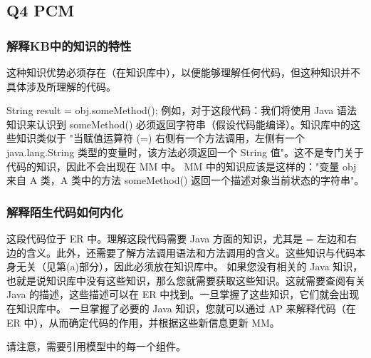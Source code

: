 \subsection{Q4 PCM}
\subsubsection{解释KB中的知识的特性}

这种知识优势必须存在（在知识库中），以便能够理解任何代码，但这种知识并不具体涉及所理解的代码。

String result = obj.someMethod(); 例如，对于这段代码：我们将使用 Java 语法知识来认识到 someMethod() 必须返回字符串（假设代码能编译）。知识库中的这些知识类似于 "当赋值运算符 (=) 右侧有一个方法调用，左侧有一个 java.lang.String 类型的变量时，该方法必须返回一个 String 值"。这不是专门关于代码的知识，因此不会出现在 MM 中。
MM 中的知识应该是这样的："变量 obj 来自 A 类，A 类中的方法 someMethod() 返回一个描述对象当前状态的字符串"。

\subsubsection{解释陌生代码如何内化}
这段代码位于 ER 中。理解这段代码需要 Java 方面的知识，尤其是 = 左边和右边的含义。此外，还需要了解方法调用语法和方法调用的含义。这些知识与代码本身无关（见第(a)部分），因此必须放在知识库中。
如果您没有相关的 Java 知识，也就是说知识库中没有这些知识，那么您就需要获取这些知识。这就需要查阅有关 Java 的描述，这些描述可以在 ER 中找到。一旦掌握了这些知识，它们就会出现在知识库中。
一旦掌握了必要的 Java 知识，您就可以通过 AP 来解释代码（在 ER 中），从而确定代码的作用，并根据这些新信息更新 MM。

请注意，需要引用模型中的每一个组件。